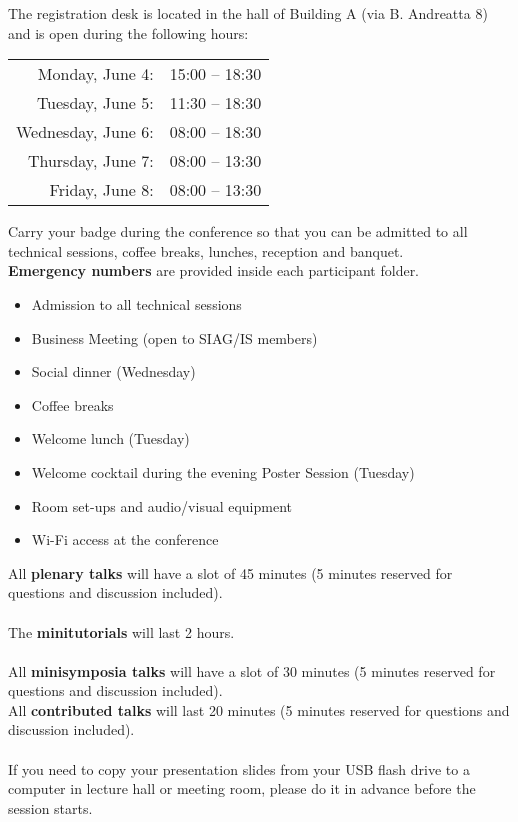 \newpage

The registration desk is located in the hall of Building A (via B. Andreatta 8) and is open during the following hours:

\bigskip

\begin{tabular}{r l }
      Monday, June 4: & 15:00 -- 18:30 \\
     Tuesday, June 5: & 11:30 -- 18:30 \\
   Wednesday, June 6: & 08:00 -- 18:30 \\
    Thursday, June 7: & 08:00 -- 13:30 \\
      Friday, June 8: & 08:00 -- 13:30 \\
\end{tabular}

Carry your badge during the conference so that you can be admitted to all technical sessions, coffee breaks, lunches, reception and banquet.\\
\textbf{Emergency numbers} are provided inside each participant folder. 


\bigskip

\begin{itemize}
  \item Admission to all technical sessions
  \item Business Meeting (open to SIAG/IS members)
  \item Social dinner (Wednesday)
  \item Coffee breaks 
  \item Welcome lunch (Tuesday)
  \item Welcome cocktail during the evening Poster Session (Tuesday)
  \item Room set-ups and audio/visual equipment
  \item Wi-Fi access at the conference
\end{itemize}%



\noindent All \textbf{plenary talks} will have a slot of 45 minutes
(5 minutes reserved for questions and discussion included).\\\\
The \textbf{minitutorials} will last 2 hours.\\\\
All \textbf{minisymposia talks} will have a slot of 30 minutes (5 minutes reserved for questions and discussion included).\\
All \textbf{contributed talks} will last 20 minutes (5 minutes reserved for questions and discussion included).\\\\
If you need to copy your presentation slides from your USB flash drive to a computer in lecture hall or meeting room, please do it in advance before
the session starts.

